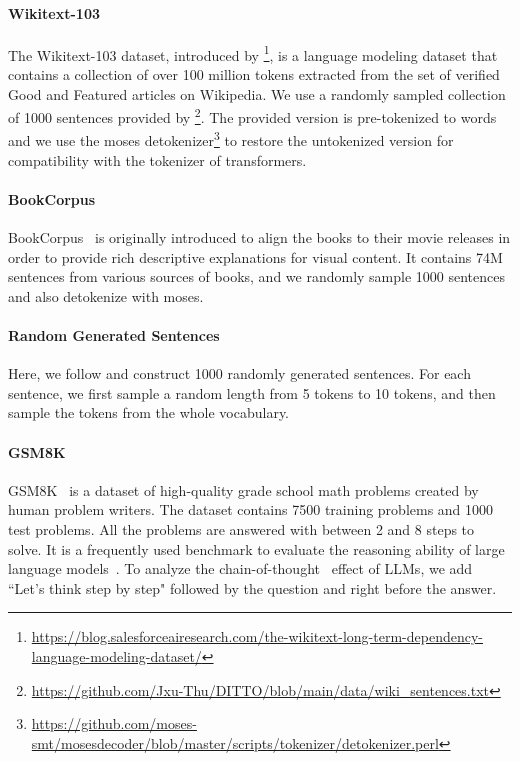 \paragraph*{Wikitext-103}
The Wikitext-103 dataset, introduced by \cite{merity2016pointer}\footnote{\url{https://blog.salesforceairesearch.com/the-wikitext-long-term-dependency-language-modeling-dataset/}}, is a language modeling dataset that contains a collection of over 100 million tokens extracted from the set of verified Good and Featured articles on Wikipedia. 
We use a randomly sampled collection of 1000 sentences provided by \cite{xu2022learning}\footnote{\url{https://github.com/Jxu-Thu/DITTO/blob/main/data/wiki_sentences.txt}}. 
The provided version is pre-tokenized to words and we use the moses detokenizer\footnote{\url{https://github.com/moses-smt/mosesdecoder/blob/master/scripts/tokenizer/detokenizer.perl}} to restore the untokenized version for compatibility with the tokenizer of transformers. 

\paragraph*{BookCorpus}
BookCorpus~\citep{Zhu_2015_ICCV} is originally introduced to align the books to their movie releases in order to provide rich descriptive explanations for visual content. It contains 74M sentences from various sources of books, and we randomly sample 1000 sentences and also detokenize with moses. 

\paragraph*{Random Generated Sentences}
Here, we follow \cite{xu2022learning} and construct 1000 randomly generated sentences. For each sentence, we first sample a random length from 5 tokens to 10 tokens, and then sample the tokens from the whole vocabulary. 

\paragraph*{GSM8K}
GSM8K~\citep{cobbe2021training} is a dataset of high-quality grade school math problems created by human problem writers. The dataset contains 7500 training problems and 1000 test problems. All the problems are answered with between 2 and 8 steps to solve. It is a frequently used benchmark to evaluate the reasoning ability of large language models~\citep{touvron2023llama,chowdhery2022palm}. To analyze the chain-of-thought~\citep{wei2022chain} effect of LLMs, we add ``Let's think step by step" followed by the question and right before the answer.


